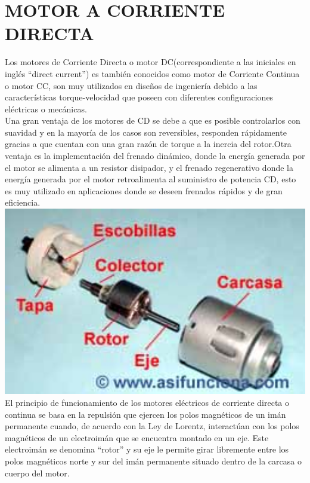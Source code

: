 \documentclass[12pt,a4paper]{article}
\begin{document}
\section{MOTOR A CORRIENTE DIRECTA}
Los motores de Corriente Directa o motor DC(correspondiente a las iniciales en ingl\'es “direct current”) es tambi\'en conocidos como motor de Corriente Continua o motor CC, son  muy utilizados en dise\~nos de ingenier\'ia debido a las caracter\'isticas torque-velocidad que poseen con diferentes configuraciones el\'ectricas o mec\'anicas.\\Una gran ventaja de los motores de CD se debe a que es posible controlarlos con suavidad y en la mayor\'ia de los casos son reversibles, responden r\'apidamente gracias a que cuentan con una gran raz\'on de torque a la inercia del rotor.Otra ventaja es la implementaci\'on del frenado din\'amico, donde la energ\'ia generada por el motor se alimenta a un resistor disipador, y el frenado regenerativo donde la energ\'ia generada por el motor retroalimenta al suministro de potencia CD, esto es muy utilizado en aplicaciones donde se deseen frenados r\'apidos y de gran eficiencia.\\
\includegraphics[width=15cm]{img14_mot_cd_250px.jpg} \\
El principio de funcionamiento de los motores el\'ectricos de corriente directa o continua se basa en la repulsi\'on que ejercen los polos magn\'eticos de un im\'an permanente cuando, de acuerdo con la Ley de Lorentz, interact\'uan con los polos magn\'eticos de un electroim\'an que se encuentra montado en un eje. Este electroim\'an se denomina “rotor” y su eje le permite girar libremente entre los polos magn\'eticos norte y sur del im\'an permanente situado dentro de la carcasa o cuerpo del motor.
\end{document}
